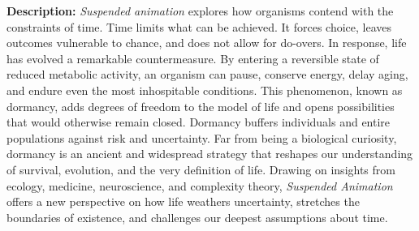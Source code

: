 \documentclass[11pt]{article}
\begin{document}
\textbf{Description:} \textit{Suspended animation} explores how organisms contend with the constraints of time. Time limits what can be achieved. It forces choice, leaves outcomes vulnerable to chance, and does not allow for do-overs. In response, life has evolved a remarkable countermeasure. By entering a reversible state of reduced metabolic activity, an organism can pause, conserve energy, delay aging, and endure even the most inhospitable conditions. This phenomenon, known as dormancy, adds degrees of freedom to the model of life and opens possibilities that would otherwise remain closed. Dormancy buffers individuals and entire populations against risk and uncertainty. Far from being a biological curiosity, dormancy is an ancient and widespread strategy that reshapes our understanding of survival, evolution, and the very definition of life. Drawing on insights from ecology, medicine, neuroscience, and complexity theory, \textit{Suspended Animation} offers a new perspective on how life weathers uncertainty, stretches the boundaries of existence, and challenges our deepest assumptions about time.
\end{document}
